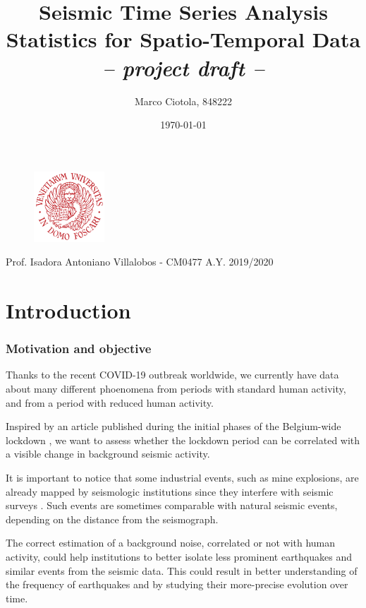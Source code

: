 \documentclass[12pt]{article}
\title{Seismic Time Series Analysis\\Statistics for Spatio-Temporal Data\\\textit{-- project draft --}}
\author{Marco Ciotola, 848222}
\date{\today}
\begin{document}
\maketitle
\begin{figure}[t!]
	\begin{center}
		\includegraphics[width=100px]{ca_foscari_logo.png}
	\end{center}
\end{figure}
\vfill Prof. Isadora Antoniano Villalobos - CM0477
\hfill A.Y. 2019/2020
\newpage
\tableofcontents \clearpage
{}



\section{Introduction}

\subsubsection{Motivation and objective}
Thanks to the recent COVID-19 outbreak worldwide, we currently have data about many different phoenomena from periods with standard human activity, and from a period with reduced human activity.

Inspired by an article published during the initial phases of the Belgium-wide lockdown \cite{NatureCoronavirusSeismic}, we want to assess whether the lockdown period can be correlated with a visible change in background seismic activity.

It is important to notice that some industrial events, such as mine explosions, are already mapped by seismologic institutions since they interfere with seismic surveys \cite{OtherSeismicEvents}. Such events are sometimes comparable with natural seismic events, depending on the distance from the seismograph.

The correct estimation of a background noise, correlated or not with human activity, could help institutions to better isolate less prominent earthquakes and similar events from the seismic data. This could result in better understanding of the frequency of earthquakes and by studying their more-precise evolution over time.
\end{document}
